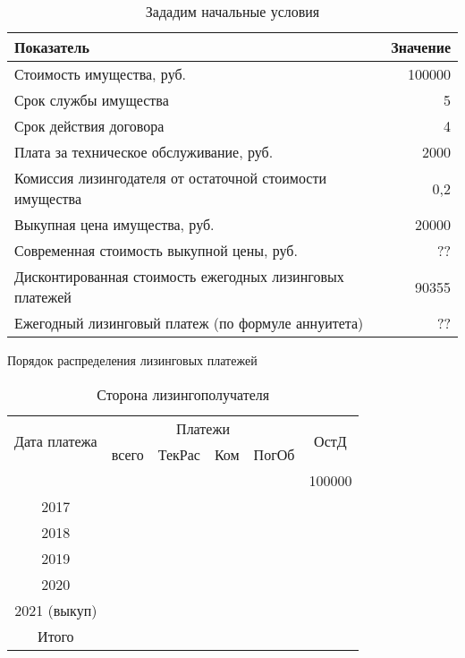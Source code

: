 \documentclass[_Banking_p3.tex]{subfiles}
\begin{document}
\begin{frame}[shrink=20]
\begin{table}[htbp]
  \centering
  \caption{Зададим начальные условия}
	\begin{tabularx}{\linewidth}[b]{@{}>{\raggedright\arraybackslash}Xr@{}}
    \toprule
    Показатель & Значение \\
    \midrule
    Стоимость имущества, руб. & 100000 \\
    Срок службы имущества & 5 \\
    Срок действия договора & 4 \\
    Плата за техническое обслуживание, руб. & 2000 \\
    Комиссия лизингодателя \linebreak от остаточной стоимости имущества & 0,2 \\
    Выкупная цена имущества, руб. & 20000 \\
    Современная стоимость выкупной цены, руб. & ?? \\
    Дисконтированная стоимость ежегодных лизинговых платежей & 90355 \\
    Ежегодный лизинговый платеж  \linebreak (по формуле аннуитета) & ??\\
    \bottomrule
    \end{tabularx}%
  \label{tab:addlabel}%
\end{table}%

\end{frame}

\begin{frame}{Порядок распределения лизинговых платежей}
\begin{table}[htbp]
  \centering
  \scriptsize
  \caption{Сторона лизингополучателя}
    \begin{tabular}{crrrrr}
    \toprule
    \multicolumn{1}{c}{\multirow{2}[0]{*}{Дата платежа}} & \multicolumn{4}{c}{Платежи}   & \multicolumn{1}{c}{\multirow{2}[0]{*}{ОстД}} \\\cmidrule{2-5}
    \multicolumn{1}{c}{} & \multicolumn{1}{c}{всего} & \multicolumn{1}{c}{ТекРас} & \multicolumn{1}{c}{Ком} & \multicolumn{1}{c}{ПогОб} & \multicolumn{1}{c}{} \\
    \midrule
          &       &       &       &       & 100000 \\
    \midrule
    2017  &       &       &       &       &  \\
    2018  &       &       &       &       &  \\
    2019  &       &       &       &       &  \\
    2020  &       &       &       &       &  \\
    2021 (выкуп) &       &       &       &       &  \\
    \midrule
    Итого &       &       &       &       &  \\
    \bottomrule
    \end{tabular}%
  \label{tab:addlabel}%
\end{table}%
\end{frame}
\end{document}

